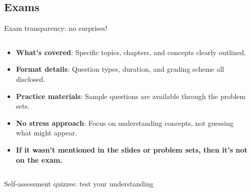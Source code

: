 \documentclass[aspectratio=169, lualatex, handout]{beamer}
\begin{document}
\subsection{Exams}

\begin{frame}{Exam transparency: no surprises!}
	\begin{columns}[c]
		\begin{column}{0.65\textwidth}
			\begin{itemize}[<+->]
				\item \textbf{What's covered}: Specific topics, chapters, and concepts clearly outlined.
				\item \textbf{Format details}: Question types, duration, and grading scheme all disclosed.
				\item \textbf{Practice materials}: Sample questions are available through the problem sets.
				\item \textbf{No stress approach}: Focus on understanding concepts, not guessing what might appear.
				\item \textbf{If it wasn't mentioned in the slides or problem sets, then it's not on the exam.}
			\end{itemize}
		\end{column}
		\begin{column}{0.35\textwidth}
		\end{column}
	\end{columns}
\end{frame}

\begin{frame}{Self-assessment quizzes: test your understanding}
	\begin{columns}[c]
		\begin{column}{0.65\textwidth}
		\end{column}
		\begin{column}{0.35\textwidth}
		\end{column}
	\end{columns}
\end{frame}
\end{document}
